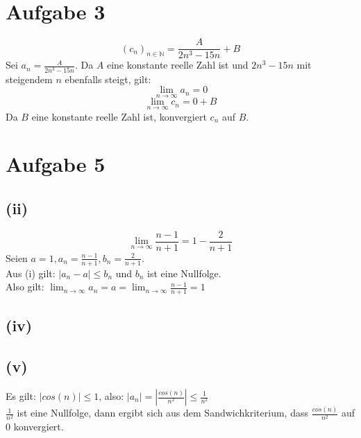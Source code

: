 \documentclass{article}
\begin{document}
\section{Aufgabe 3}
\[(c_n)_{n \in \mathbb{N}}=\frac{A}{2n^3-15n}+B\]
Sei $a_n = \frac{A}{2n^3-15n}$. Da $A$ eine konstante reelle Zahl ist und $2n^3-15n$ mit steigendem $n$ ebenfalls steigt, gilt:
\[\lim_{n \to \infty} a_n = 0\]
\[\lim_{n \to \infty} c_n = 0 + B\]
Da $B$ eine konstante reelle Zahl ist, konvergiert $c_n$ auf $B$.

\section{Aufgabe 5}
\subsection{(ii)}
\[\lim_{n \to \infty} \frac{n-1}{n+1} = 1 - \frac{2}{n+1}\]
Seien $a = 1, a_n = \frac{n-1}{n+1}, b_n = \frac{2}{n+1}$. \\
Aus (i) gilt: $|a_n - a| \leq b_n$ und $b_n$ ist eine Nullfolge. \\
Also gilt: $\lim_{n\to\infty}a_n = a = \lim_{n\to\infty}\frac{n-1}{n+1} = 1$
\subsection{(iv)}

\subsection{(v)}
Es gilt: $|cos(n)| \leq 1$, also: $|a_n| = \left|\frac{cos(n)}{n^2}\right| \leq \frac{1}{n^2}$ \\
\newline
$\frac{1}{n^2}$ ist eine Nullfolge, dann ergibt sich aus dem Sandwichkriterium, dass $\frac{cos(n)}{n^2}$ auf 0 konvergiert.
\end{document}
